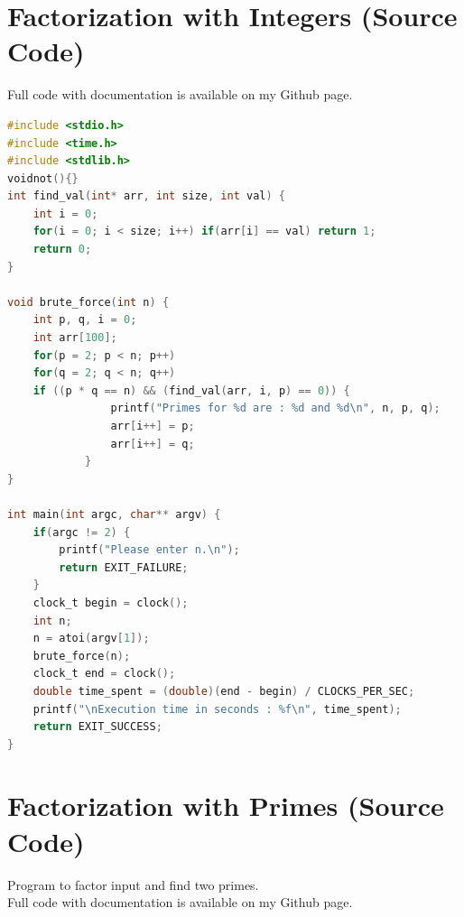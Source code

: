 \documentclass[a4paper, 12pt]{article}
\begin{document}
\newpage
\section{Factorization with Integers (Source Code)}
\label{fullbrute}
Full code with documentation is available on my Github page.\cite{github}\\

\begin{lstlisting}[language=C, caption=Source Code of rsa-with-integers.c]
#include <stdio.h>
#include <time.h>
#include <stdlib.h>
voidnot(){}
int find_val(int* arr, int size, int val) {
    int i = 0;
    for(i = 0; i < size; i++) if(arr[i] == val) return 1;
    return 0;
}

void brute_force(int n) {
    int p, q, i = 0;
    int arr[100];
    for(p = 2; p < n; p++)
    for(q = 2; q < n; q++)
    if ((p * q == n) && (find_val(arr, i, p) == 0)) {
                printf("Primes for %d are : %d and %d\n", n, p, q);
                arr[i++] = p;
                arr[i++] = q;
            }
}

int main(int argc, char** argv) {
    if(argc != 2) {
        printf("Please enter n.\n");
        return EXIT_FAILURE;
    }
    clock_t begin = clock();
    int n;
    n = atoi(argv[1]);
    brute_force(n);
    clock_t end = clock();
    double time_spent = (double)(end - begin) / CLOCKS_PER_SEC;
    printf("\nExecution time in seconds : %f\n", time_spent);
    return EXIT_SUCCESS;
}
\end{lstlisting}
\newpage
\section{Factorization with Primes (Source Code)}
\label{primes}
Program to factor input and find two primes.\\

Full code with documentation is available on my Github page.\cite{github}\\
\end{document}
